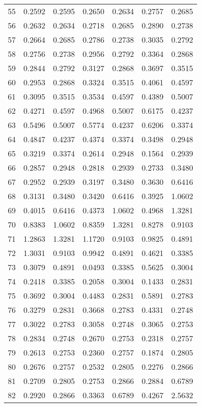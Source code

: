 \begin{center}
\begin{longtable}{lcccccc}
    55 &0.2592&0.2595&0.2650&0.2634&0.2757&0.2685 \\
    56 &0.2632&0.2634&0.2718&0.2685&0.2890&0.2738 \\
    57 &0.2664&0.2685&0.2786&0.2738&0.3035&0.2792 \\
    58 &0.2756&0.2738&0.2956&0.2792&0.3364&0.2868 \\
    59 &0.2844&0.2792&0.3127&0.2868&0.3697&0.3515 \\
    60 &0.2953&0.2868&0.3324&0.3515&0.4061&0.4597 \\
    61 &0.3095&0.3515&0.3534&0.4597&0.4389&0.5007 \\
    62 &0.4271&0.4597&0.4968&0.5007&0.6175&0.4237 \\
    63 &0.5496&0.5007&0.5774&0.4237&0.6206&0.3374 \\
    64 &0.4847&0.4237&0.4374&0.3374&0.3498&0.2948 \\
    65 &0.3219&0.3374&0.2614&0.2948&0.1564&0.2939 \\
    66 &0.2857&0.2948&0.2818&0.2939&0.2733&0.3480 \\
    67 &0.2952&0.2939&0.3197&0.3480&0.3630&0.6416 \\
    68 &0.3131&0.3480&0.3420&0.6416&0.3925&1.0602 \\
    69 &0.4015&0.6416&0.4373&1.0602&0.4968&1.3281 \\
    70 &0.8383&1.0602&0.8359&1.3281&0.8278&0.9103 \\
    71 &1.2863&1.3281&1.1720&0.9103&0.9825&0.4891 \\
    72 &1.3031&0.9103&0.9942&0.4891&0.4621&0.3385 \\
    73 &0.3079&0.4891&0.0493&0.3385&0.5625&0.3004 \\
    74 &0.2418&0.3385&0.2058&0.3004&0.1433&0.2831 \\
    75 &0.3692&0.3004&0.4483&0.2831&0.5891&0.2783 \\
    76 &0.3279&0.2831&0.3668&0.2783&0.4331&0.2748 \\
    77 &0.3022&0.2783&0.3058&0.2748&0.3065&0.2753 \\
    78 &0.2834&0.2748&0.2670&0.2753&0.2318&0.2757 \\
    79 &0.2613&0.2753&0.2360&0.2757&0.1874&0.2805 \\
    80 &0.2676&0.2757&0.2532&0.2805&0.2276&0.2866 \\
    81 &0.2709&0.2805&0.2753&0.2866&0.2884&0.6789 \\
    82 &0.2920&0.2866&0.3363&0.6789&0.4267&2.5632 \\

\end{longtable}
\end{center}
